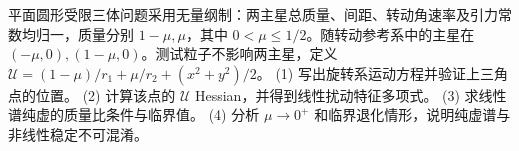 平面圆形受限三体问题采用无量纲制：两主星总质量、间距、转动角速率及引力常数均归一，质量分别 \(1-\mu,\mu\)，其中 \(0<\mu\le1/2\)。随转动参考系中的主星在 \((-\mu,0),(1-\mu,0)\)。测试粒子不影响两主星，定义 \(\mathcal U=(1-\mu)/r_1+\mu/r_2+(x^2+y^2)/2\)。
(1) 写出旋转系运动方程并验证上三角点的位置。
(2) 计算该点的 \(\mathcal U\) Hessian，并得到线性扰动特征多项式。
(3) 求线性谱纯虚的质量比条件与临界值。
(4) 分析 \(\mu\to0^+\) 和临界退化情形，说明纯虚谱与非线性稳定不可混淆。
